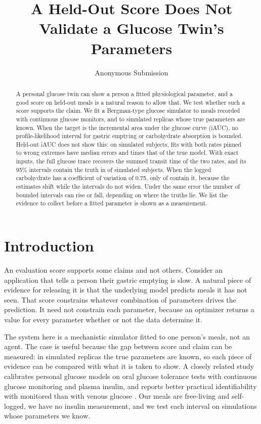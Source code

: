 \documentclass[letterpaper]{article} %
\title{A Held-Out Score Does Not Validate a Glucose Twin's Parameters}
\author{
    Anonymous Submission
}
\begin{document}
\maketitle

\begin{abstract}
A personal glucose twin can show a person a fitted physiological parameter, and a good score on held-out meals is a natural reason to allow that. We test whether such a score supports the claim. We fit a Bergman-type glucose simulator to meals recorded with continuous glucose monitors, and to simulated replicas whose true parameters are known. When the target is the incremental area under the glucose curve (iAUC), no profile-likelihood interval for gastric emptying or carbohydrate absorption is bounded. Held-out iAUC does not show this: on simulated subjects, fits with both rates pinned to wrong extremes have median errors \resNegZeroSlowRefitIauc{} and \resNegZeroFastRefitIauc{} times that of the true model. With exact inputs, the full glucose trace recovers the summed transit time of the two rates, and its 95\% intervals contain the truth in \wsRandAZeroCover{} of \wsN{} simulated subjects. When the logged carbohydrate has a coefficient of variation of 0.75, only \wsRandAThreeQuarterCover{} of \wsN{} contain it, because the estimates shift while the intervals do not widen. Under the same error the number of bounded intervals can rise or fall, depending on where the truths lie. We list the evidence to collect before a fitted parameter is shown as a measurement.
\end{abstract}

\section{Introduction}

An evaluation score supports some claims and not others. Consider an application that tells a person their gastric emptying is slow. A natural piece of evidence for releasing it is that the underlying model predicts meals it has not seen. That score constrains whatever combination of parameters drives the prediction. It need not constrain each parameter, because an optimizer returns a value for every parameter whether or not the data determine it.

The system here is a mechanistic simulator fitted to one person's meals, not an agent. The case is useful because the gap between score and claim can be measured: in simulated replicas the true parameters are known, so each piece of evidence can be compared with what it is taken to show. A closely related study calibrates personal glucose models on oral glucose tolerance tests with continuous glucose monitoring and plasma insulin, and reports better practical identifiability with monitored than with venous glucose \citep{erdos2024leveraging}. Our meals are free-living and self-logged, we have no insulin measurement, and we test each interval on simulations whose parameters we know.
\end{document}
